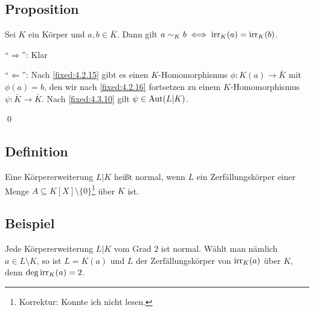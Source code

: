 \subsection{Proposition} Sei $K$ ein Körper und $a,b \in \bar K$. Dann gilt $a \sim_K b \iff \operatorname{irr}_K(a) = \operatorname{irr}_K(b)$.

\proof "`$\Longrightarrow$"': Klar

"`$\Longleftarrow$"': Nach \ref{fixed:4.2.15} gibt es einen $K$-Homomorphismus $\phi : K(a) \to \bar K$ mit $\phi(a) =b$, den wir nach \ref{fixed:4.2.16} fortsetzen zu einem $K$-Homomorphismus $\psi:\bar K \to \bar K$. Nach \ref{fixed:4.3.10} gilt $\psi \in \operatorname{Aut}(L|K)$.

\begin{figure}[h]
	\centering
\end{figure}
\qed

\subsection{Definition} Eine Körpererweiterung $L|K$ heißt normal, wenn $L$ ein Zerfällungskörper einer Menge $A \subseteq K[X] \setminus \{0\}$\footnote{Korrektur: Konnte ich nicht lesen.} über $K$ ist.

\subsection{Beispiel} Jede Körpererweiterung $L|K$ vom Grad $2$ ist normal. Wählt man nämlich $a \in L \setminus K$, so ist $L = K(a)$ und $L$ der Zerfällungskörper von $\operatorname{irr}_K(a)$ über $K$, denn $\deg \operatorname{irr}_K(a)=2$.

